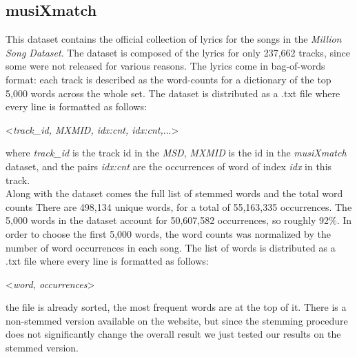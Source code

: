 \documentclass[a4paper, 11pt]{article} %
\begin{document}
\subsection*{musiXmatch}
This dataset contains the official collection of lyrics for the songs in the \textit{Million Song Dataset}. The dataset is composed of the lyrics for only 237,662 tracks, since some were not released for various reasons. The lyrics come in bag-of-words format: each track is described as the word-counts for a dictionary of the top 5,000 words across the whole set. The dataset is distributed as a .txt file where every line is formatted as follows: 
\begin{center}<\textit{track\_id, MXMID, idx:cnt, idx:cnt,}...> \end{center}
where \textit{track\_id} is the track id in the \textit{MSD}, \textit{MXMID} is the id in the \textit{musiXmatch} dataset, and the pairs \textit{idx:cnt} are the occurrences of word of index \textit{idx} in this track. \\
Along with the dataset comes the full list of stemmed words and the total word counts There are 498,134 unique words, for a total of 55,163,335 occurrences. The 5,000 words in the dataset account for 50,607,582 occurrences, so roughly 92\%. In order to choose the first 5,000 words, the word counts was normalized by the number of word occurrences in each song. The list of words is distributed as a .txt file where every line is formatted as follows:
\begin{center}<\textit{word, occurrences}> \end{center}
the file is already sorted, the most frequent words are at the top of it.
There is a non-stemmed version available on the website, but since the stemming procedure does not significantly change the overall result we just tested our results on the stemmed version.
\end{document}
